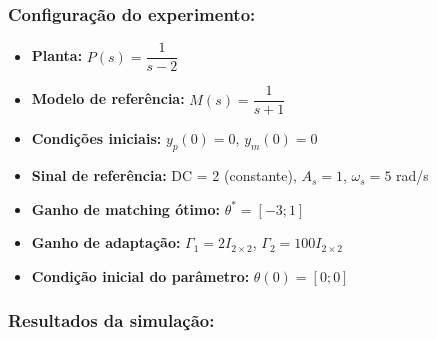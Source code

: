 \documentclass[10pt]{article}
\begin{document}
\subsubsection{Configuração do experimento:}
\begin{itemize}
\item \textbf{Planta:} $P(s) = \dfrac{1}{s - 2}$
\item \textbf{Modelo de referência:} $M(s) = \dfrac{1}{s + 1}$
\item \textbf{Condições iniciais:} $y_p(0)=0$, $y_m(0)=0$
\item \textbf{Sinal de referência:} DC = 2 (constante), $A_s=1$, $\omega_s=5$ rad/s
\item \textbf{Ganho de matching ótimo:} $\theta^* = [-3;1]$
\item \textbf{Ganho de adaptação:} $\Gamma_1 = 2I_{2\times2}$, $\Gamma_2 = 100 I_{2\times2}$
\item \textbf{Condição inicial do parâmetro:} $\theta(0) = [0;0]$
\end{itemize}

\subsubsection{Resultados da simulação:}
\end{document}
